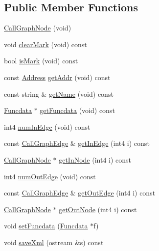 \subsection*{Public Member Functions}
\begin{DoxyCompactItemize}
\item 
\mbox{\hyperlink{class_call_graph_node_aed74dde8d91adb395775a712655e2d2c}{Call\+Graph\+Node}} (void)
\item 
void \mbox{\hyperlink{class_call_graph_node_aa61644a0a00f64254a00c04dec29a054}{clear\+Mark}} (void) const
\item 
bool \mbox{\hyperlink{class_call_graph_node_aaa58a7c325e39670fcb45b98fb9882b4}{is\+Mark}} (void) const
\item 
const \mbox{\hyperlink{class_address}{Address}} \mbox{\hyperlink{class_call_graph_node_a8b884b92324abe22eb8c2442c027b660}{get\+Addr}} (void) const
\item 
const string \& \mbox{\hyperlink{class_call_graph_node_a2277f2f032877d1f0251e5bdb6c4b32a}{get\+Name}} (void) const
\item 
\mbox{\hyperlink{class_funcdata}{Funcdata}} $\ast$ \mbox{\hyperlink{class_call_graph_node_af0cc63edc8f21a1fc4abe1d64fd1d17f}{get\+Funcdata}} (void) const
\item 
int4 \mbox{\hyperlink{class_call_graph_node_aa6130dd67993dbf34737b9560ff88dbd}{num\+In\+Edge}} (void) const
\item 
const \mbox{\hyperlink{class_call_graph_edge}{Call\+Graph\+Edge}} \& \mbox{\hyperlink{class_call_graph_node_a74c8585fd8fb11a824646c42d7abf3a6}{get\+In\+Edge}} (int4 i) const
\item 
\mbox{\hyperlink{class_call_graph_node}{Call\+Graph\+Node}} $\ast$ \mbox{\hyperlink{class_call_graph_node_ab795928265254bfa049b445baf7eabcc}{get\+In\+Node}} (int4 i) const
\item 
int4 \mbox{\hyperlink{class_call_graph_node_a0c8f85c80e891f9d7fe71277d0391671}{num\+Out\+Edge}} (void) const
\item 
const \mbox{\hyperlink{class_call_graph_edge}{Call\+Graph\+Edge}} \& \mbox{\hyperlink{class_call_graph_node_af4e36e64c9990d6e77a8858217429676}{get\+Out\+Edge}} (int4 i) const
\item 
\mbox{\hyperlink{class_call_graph_node}{Call\+Graph\+Node}} $\ast$ \mbox{\hyperlink{class_call_graph_node_aa3cdd86912417b09815e2a6c478f6ff2}{get\+Out\+Node}} (int4 i) const
\item 
void \mbox{\hyperlink{class_call_graph_node_adf4b77eb0513240ef97b1e0381758dad}{set\+Funcdata}} (\mbox{\hyperlink{class_funcdata}{Funcdata}} $\ast$f)
\item 
void \mbox{\hyperlink{class_call_graph_node_a0379699be791f33d9b411adb19bec7a5}{save\+Xml}} (ostream \&s) const
\end{DoxyCompactItemize}

